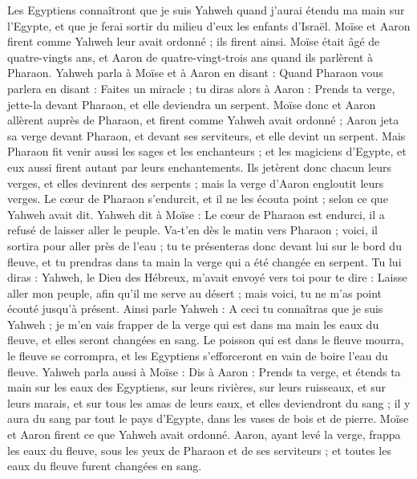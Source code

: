 \begin{multicols}{2}
Les Egyptiens connaîtront que je suis Yahweh quand j'aurai étendu ma main sur l'Egypte, et que je ferai sortir du milieu d'eux les enfants d'Israël.
Moïse et Aaron firent comme Yahweh leur avait ordonné ; ils firent ainsi.
Moïse était âgé de quatre-vingts ans, et Aaron de quatre-vingt-trois ans quand ils parlèrent à Pharaon.
Yahweh parla à Moïse et à Aaron en disant :
Quand Pharaon vous parlera en disant : Faites un miracle ; tu diras alors à Aaron : Prends ta verge, jette-la devant Pharaon, et elle deviendra un serpent.
Moïse donc et Aaron allèrent auprès de Pharaon, et firent comme Yahweh avait ordonné ; Aaron jeta sa verge devant Pharaon, et devant ses serviteurs, et elle devint un serpent.
Mais Pharaon fit venir aussi les sages et les enchanteurs ; et les magiciens d'Egypte, et eux aussi firent autant par leurs enchantements.
Ils jetèrent donc chacun leurs verges, et elles devinrent des serpents ; mais la verge d'Aaron engloutit leurs verges.
Le cœur de Pharaon s'endurcit, et il ne les écouta point ; selon ce que Yahweh avait dit.
Yahweh dit à Moïse : Le cœur de Pharaon est endurci, il a refusé de laisser aller le peuple.
Va-t'en dès le matin vers Pharaon ; voici, il sortira pour aller près de l'eau ; tu te présenteras donc devant lui sur le bord du fleuve, et tu prendras dans ta main la verge qui a été changée en serpent.
Tu lui diras : Yahweh, le Dieu des Hébreux, m'avait envoyé vers toi pour te dire : Laisse aller mon peuple, afin qu'il me serve au désert ; mais voici, tu ne m'as point écouté jusqu’à présent.
Ainsi parle Yahweh : A ceci tu connaîtras que je suis Yahweh ; je m'en vais frapper de la verge qui est dans ma main les eaux du fleuve, et elles seront changées en sang.
Le poisson qui est dans le fleuve mourra, le fleuve se corrompra, et les Egyptiens s’efforceront en vain de boire l’eau du fleuve.
Yahweh parla aussi à Moïse : Dis à Aaron : Prends ta verge, et étends ta main sur les eaux des Egyptiens, sur leurs rivières, sur leurs ruisseaux, et sur leurs marais, et sur tous les amas de leurs eaux, et elles deviendront du sang ; il y aura du sang par tout le pays d'Egypte, dans les vases de bois et de pierre.
Moïse et Aaron firent ce que Yahweh avait ordonné. Aaron, ayant levé la verge, frappa les eaux du fleuve, sous les yeux de Pharaon et de ses serviteurs ; et toutes les eaux du fleuve furent changées en sang.

\end{multicols}
